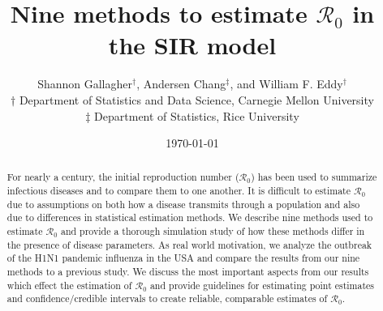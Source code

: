 \documentclass[12pt]{article}
\newcommand{\Wxxsir}{Nine } %
\newcommand{\rr}{\ensuremath{\mathcal{R}_0}}
\begin{document}




\title{\Wxxsir methods to estimate $\rr$ in the SIR model}
\author{ Shannon Gallagher$^{\dag}$, Andersen Chang$^{\ddag}$, and William F. Eddy$^{\dag}$ \\$\dag$ Department of Statistics and Data Science, Carnegie Mellon University\\ $\ddag$ Department of Statistics, Rice University}
\date{\today}
\maketitle

\begin{abstract}
For nearly a century, the initial reproduction number ($\rr$) has been used to summarize infectious diseases and to compare them to one another.  It is difficult to estimate $\rr$ due to assumptions on both how a disease transmits through a population and also due to differences in statistical estimation methods.  We describe nine methods used to estimate $\rr$ and provide a thorough simulation study of how these methods differ in the presence of disease parameters.  As real world motivation, we analyze the outbreak of the H1N1 pandemic influenza in the USA and compare the results from our nine methods to a previous study.  We discuss the most important aspects from our results which effect the estimation of $\rr$ and provide guidelines for estimating point estimates and confidence/credible intervals to create reliable, comparable estimates of $\rr$.
  \end{abstract}
\end{document}
